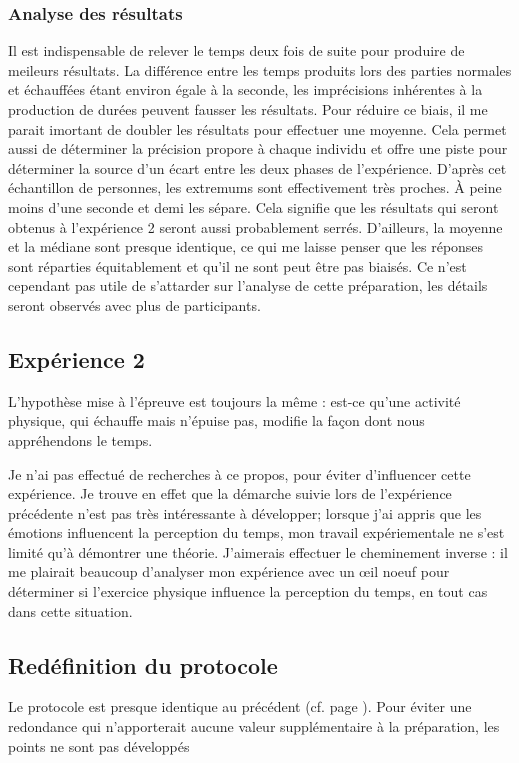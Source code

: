 \documentclass[12pt,fleqn,oneside,french,openany]{book} %
\begin{document}
\subsubsection{Analyse des résultats} \label{sssec:analyseResult2.1}
Il est indispensable de relever le temps deux fois de suite pour produire de meileurs résultats. La différence entre les temps produits lors des parties normales et échauffées étant environ égale à la seconde, les imprécisions inhérentes à la production de durées peuvent fausser les résultats. Pour réduire ce biais, il me parait imortant de doubler les résultats pour effectuer une moyenne. Cela permet aussi de déterminer la précision propore à chaque individu et offre une piste pour déterminer la source d'un écart entre les deux phases de l'expérience. D'après cet échantillon de personnes, les extremums sont effectivement très proches. À peine moins d'une seconde et demi les sépare. Cela signifie que les résultats qui seront obtenus à l'expérience 2 seront aussi probablement serrés. D'ailleurs, la moyenne et la médiane sont presque identique, ce qui me laisse penser que les réponses sont réparties équitablement et qu'il ne sont peut être pas biaisés. Ce n'est cependant pas utile de s'attarder sur l'analyse de cette préparation, les détails seront observés avec plus de participants.


\subsection{Expérience 2} \label{ssec:but2.2}
L'hypothèse mise à l'épreuve est toujours la même : est-ce qu'une activité physique, qui échauffe mais n'épuise pas, modifie la façon dont nous appréhendons le temps. 

Je n'ai pas effectué de recherches à ce propos, pour éviter d'influencer cette expérience. Je trouve en effet que la démarche suivie lors de l'expérience précédente n'est pas très intéressante à développer; lorsque j'ai appris que les émotions influencent la perception du temps, mon travail expériementale ne s'est limité qu'à démontrer une théorie. J'aimerais effectuer le cheminement inverse : il me plairait beaucoup d'analyser mon expérience avec un \oe il noeuf pour déterminer si l'exercice physique influence la perception du temps, en tout cas dans cette situation.

\subsection{Redéfinition du protocole} \label{ssec:defProto2.2}
\begin{remark}
	Le protocole est presque identique au précédent (cf. page \pageref{sssec:preparation2.1}). Pour éviter une redondance qui n'apporterait aucune valeur supplémentaire à la préparation, les points ne sont pas développés
\end{remark}
\end{document}
